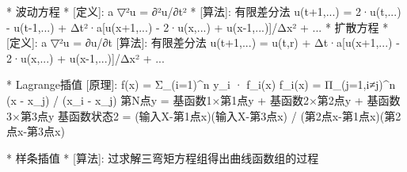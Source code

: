 *                    波动方程
*	[定义]: a ▽²u = ∂²u/∂t²
*	[算法]: 有限差分法
		u(t+1,...) = 2·u(t,...) - u(t-1,...)
				+ Δt²·a{[u(x+1,...) - 2·u(x,...) + u(x-1,...)]/Δx² + ...}
*                    扩散方程
*	[定义]: a ▽²u = ∂u/∂t
	[算法]: 有限差分法
		u(t+1,...) = u(t,r)
				+ Δt·a{[u(x+1,...) - 2·u(x,...) + u(x-1,...)]/Δx² + ...}



*					Lagrange插值
	[原理]:
		f(x) = Σ_(i=1)^n  y_i · f_i(x)
		f_i(x) = Π_(j=1,i≠j)^n  (x - x_j) / (x_i - x_j)
		第N点y = 基函数1×第1点y + 基函数2×第2点y + 基函数3×第3点y
		基函数状态2 = (输入X-第1点x)(输入X-第3点x) / (第2点x-第1点x)(第2点x-第3点x)


*					样条插值
*	[算法]: 过求解三弯矩方程组得出曲线函数组的过程
